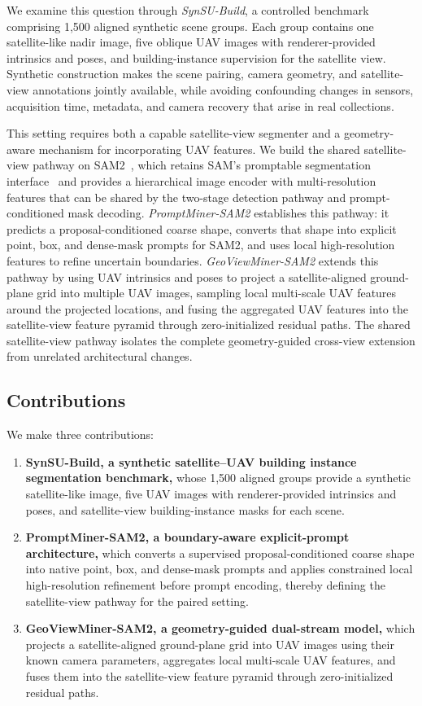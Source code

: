 \documentclass[letterpaper,journal]{IEEEtran}
\begin{document}
We examine this question through \emph{SynSU-Build}, a controlled benchmark comprising 1,500
aligned synthetic scene groups. Each group contains one satellite-like nadir image, five
oblique UAV images with renderer-provided intrinsics and poses, and building-instance
supervision for the satellite view. Synthetic construction makes the scene pairing, camera
geometry, and satellite-view annotations jointly available, while avoiding confounding changes
in sensors, acquisition time, metadata, and camera recovery that arise in real collections.

This setting requires both a capable satellite-view segmenter and a geometry-aware mechanism
for incorporating UAV features. We build the shared satellite-view pathway on
SAM2~\cite{ref_sam2}, which retains SAM's promptable segmentation interface~\cite{ref_sam} and
provides a hierarchical image encoder with multi-resolution features that can be shared by the
two-stage detection pathway and prompt-conditioned mask decoding. \emph{PromptMiner-SAM2}
establishes this pathway: it predicts a proposal-conditioned coarse shape, converts that shape
into explicit point, box, and dense-mask prompts for SAM2, and uses local high-resolution
features to refine uncertain boundaries. \emph{GeoViewMiner-SAM2} extends this pathway by using
UAV intrinsics and poses to project a satellite-aligned ground-plane grid into multiple UAV
images, sampling local multi-scale UAV features around the projected locations, and fusing the
aggregated UAV features into the satellite-view feature pyramid through zero-initialized
residual paths. The shared satellite-view pathway isolates the complete geometry-guided
cross-view extension from unrelated architectural changes.

\subsection{Contributions}

We make three contributions:
\begin{enumerate}
\item \textbf{SynSU-Build, a synthetic satellite--UAV building instance segmentation
      benchmark,} whose 1,500 aligned groups provide a synthetic satellite-like image, five UAV
      images with renderer-provided intrinsics and poses, and satellite-view building-instance
      masks for each scene.

\item \textbf{PromptMiner-SAM2, a boundary-aware explicit-prompt architecture,} which converts
      a supervised proposal-conditioned coarse shape into native point, box, and dense-mask
      prompts and applies constrained local high-resolution refinement before prompt encoding,
      thereby defining the satellite-view pathway for the paired setting.

\item \textbf{GeoViewMiner-SAM2, a geometry-guided dual-stream model,} which projects a
      satellite-aligned ground-plane grid into UAV images using their known camera parameters,
      aggregates local multi-scale UAV features, and fuses them into the satellite-view feature
      pyramid through zero-initialized residual paths.
\end{enumerate}
\end{document}
